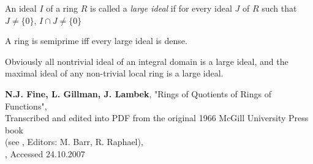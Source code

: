\documentclass[12pt]{article}
\begin{document}
An ideal $I$ of a ring $R$ is called a \emph{large ideal} if for every ideal $J$ of $R$ such that $J\neq\{0\}$, $I\cap J \neq\{0\}$

A ring is semiprime iff every large ideal is dense.

Obviously all nontrivial ideal of an integral domain is a large ideal, and the maximal ideal of any non-trivial local ring is a large ideal.

\begin{thebibliography}{99}
\textbf{N.J. Fine, L. Gillman, J. Lambek}, 
"Rings of Quotients of Rings of Functions",\\
Transcribed and edited into PDF from the original 1966 McGill University Press book \\
(see , Editors: M. Barr, R. Raphael),\\
,
Accessed 24.10.2007
\end{thebibliography}
\end{document}
